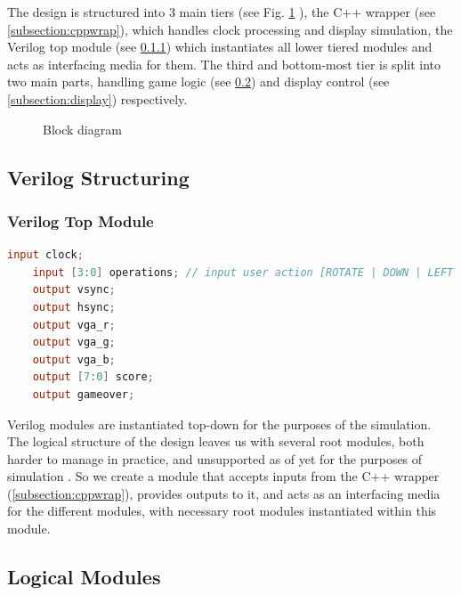 The design is structured into 3 main tiers (see Fig. \ref{fig:blockdiag} ),
the C++ wrapper (see \ref{subsection:cppwrap}), which handles clock
processing and display simulation, the Verilog top module (see \ref{subsection:wrapper})
which instantiates all lower tiered modules and acts as interfacing
media for them. The third and bottom-most tier is split into two 
main parts, handling game logic (see \ref{subsection:logicalmod}) and
display control (see \ref{subsection:display}) respectively.

\begin{figure}[ht]
    \centering
    
    \caption{Block diagram}
\label{fig:blockdiag}
\end{figure}

\subsection{Verilog Structuring}

\subsubsection{Verilog Top Module}
\label{subsection:wrapper}
%
\begin{lstlisting}[language=Verilog]
    input clock;
    input [3:0] operations; // input user action [ROTATE | DOWN | LEFT | RIGHT]
    output vsync;
    output hsync;
    output vga_r;
    output vga_g;
    output vga_b;
    output [7:0] score;
    output gameover;
\end{lstlisting}

Verilog modules are instantiated top-down for the purposes of the 
simulation. The logical structure of the design leaves us with 
several root modules, both harder to manage in practice, and 
unsupported as of yet for the purposes of simulation \cite{verilatortopmod}.
So we create a module that accepts inputs from the C++ wrapper (\ref{subsection:cppwrap}),
provides outputs to it, and acts as an interfacing media for the different
modules, with necessary root modules instantiated within this module.\\

\subsection{Logical Modules}
\label{subsection:logicalmod}
